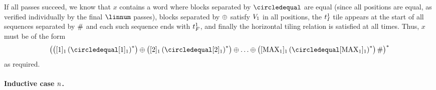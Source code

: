 If all passes succeed, we know that $x$ contains a word where blocks separated by $\numeq$ are equal
(since all positions are equal, as verified individually by the final $\linnum$ passes),
blocks separated by $\oplus$ satisfy $V_{1}$ in all positions,
the $t_I^{1}$ tile appears at the start of all sequences separated by $\#$ and each such sequence ends with $t_F^{1}$, and
finally the horizontal tiling relation is satisfied at all times.
Thus, $x$ must be of the form
\[
    \brac{
        \brac{\tenc{1}{1} \brac{\numeq \tenc{1}{1}}^\ast}
        \numplus
        \brac{\tenc{1}{2} \brac{\numeq \tenc{1}{2}}^\ast}
        \numplus
        \ldots
        \numplus
        \brac{
            \tenc{1}{\nmax{1}}
                \brac{\numeq \tenc{1}{\nmax{1}}}^\ast
        }
        \numsep
    }^\ast
\]
as required.


\paragraph{Inductive case $n$.}

